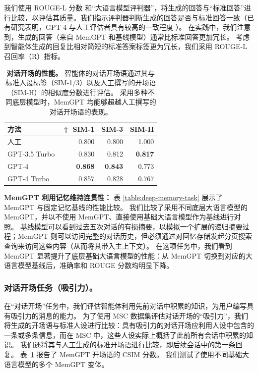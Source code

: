 \documentclass[UTF8,fontset=fandol,a4paper,11pt]{ctexart}
\newcommand{\ours}{MemGPT\xspace}
\begin{document}
我们使用 ROUGE-L 分数 \citep{lin2004rouge} 和“大语言模型评判器”，将生成的回答与“标准回答”进行比较，以评估其质量。我们指示评判器判断生成的回答是否与标准回答一致（已有研究表明，GPT-4 与人工评估者具有较高的一致程度 \citep{zheng2023llmasajudge}）。
在实践中，我们注意到，生成的回答（来自 \ours 和基线模型）通常比标准回答更加冗长。
考虑到智能体生成的回复比相对简短的标准答案标签更为冗长，我们采用 ROUGE-L 召回率（R）指标。










\begin{table}[t]
\caption{
\textbf{对话开场的性能。}
智能体的对话开场语通过其与标准人设标签（SIM-1/3）以及人工撰写的开场语（SIM-H）的相似度分数进行评估。
采用多种不同底层模型时，MemGPT 均能够超越人工撰写的对话开场语的表现。
}
\label{table:msc-opener-task}
\begin{center}
\begin{tabular}{lrrr}
\toprule
\bf 方法
&  $\Uparrow$ \textbf{SIM-1} & \textbf{SIM-3} & \textbf{SIM-H}
\\
\midrule
人工 & 0.800 & 0.800 & 1.000  \\
\midrule
GPT-3.5 Turbo & 0.830 & 0.812 & \bf 0.817 \\
GPT-4 &  \bf 0.868 &  \bf 0.843 &  0.773 \\
GPT-4 Turbo & 0.857 & 0.828 & 0.767 \\
\bottomrule
\end{tabular}
\end{center}
\end{table}




\textbf{\ours 利用记忆维持连贯性：}
表 \ref{table:deep-memory-task} 展示了 \ours 与固定记忆基线的性能比较。
我们比较了采用不同底层大语言模型的 MemGPT，并以不使用 MemGPT、直接使用基础大语言模型作为基线进行对照。
基线模型可以看到过去五次对话的有损摘要，以模拟一个扩展的递归摘要过程；MemGPT 则可以访问完整的对话历史，但必须通过对回忆存储发起分页搜索查询来访问这些内容（从而将其带入主上下文）。
在这项任务中，我们看到 MemGPT 显著提升了底层基础大语言模型的性能：从 MemGPT 切换到对应的大语言模型基线后，准确率和 ROUGE 分数均明显下降。



\subsubsection{对话开场任务（吸引力）。}
在“对话开场”任务中，我们评估智能体利用先前对话中积累的知识，为用户编写具有吸引力的消息的能力。
为了使用 MSC 数据集评估对话开场的“吸引力”，我们将生成的开场语与标准人设进行比较：具有吸引力的对话开场应利用人设中包含的一条或多条信息，而在 MSC 中，这些人设实际上概括了此前所有会话中积累的知识。
我们还将其与人工生成的标准开场语进行比较，即后续会话中的第一条回复。
表~\ref{table:msc-opener-task} 报告了 \ours 开场语的 CSIM 分数。
我们测试了使用不同基础大语言模型的多个 \ours 变体。
\end{document}
